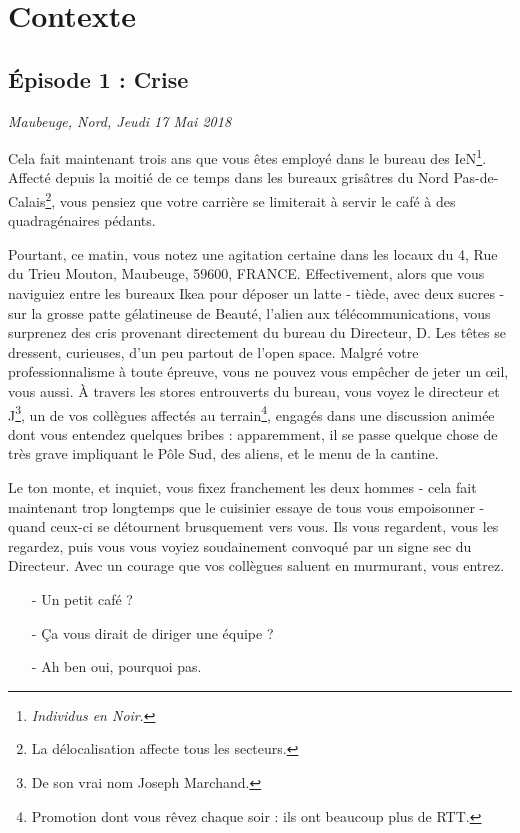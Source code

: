 \newpage

\section{Contexte}
\subsection{Épisode 1 : Crise}
\hfill \textit{Maubeuge, Nord, Jeudi 17 Mai 2018}

Cela fait maintenant trois ans que vous êtes employé dans le bureau des
IeN\footnote{\emph{Individus en Noir}\texttrademark.}.  Affecté depuis la moitié
de ce temps dans les bureaux grisâtres du Nord Pas-de-Calais\footnote{La
délocalisation affecte tous les secteurs.}, vous pensiez que votre carrière se
limiterait à servir le café à des quadragénaires pédants. 

Pourtant, ce matin, vous notez une agitation certaine dans les locaux du 4, Rue
du Trieu Mouton, Maubeuge, 59600, FRANCE.  Effectivement, alors que vous
naviguiez entre les bureaux Ikea pour déposer un latte - tiède, avec deux sucres
- sur la grosse patte gélatineuse de Beauté, l'alien aux télécommunications,
vous surprenez des cris provenant directement du bureau du Directeur, D. Les
têtes se dressent, curieuses, d'un peu partout de l'open space. Malgré votre
professionnalisme à toute épreuve, vous ne pouvez vous empêcher de jeter un œil,
vous aussi. À travers les stores entrouverts du bureau, vous voyez le directeur
et J\footnote{De son vrai nom Joseph Marchand.}, un de vos collègues affectés au
terrain\footnote{Promotion dont vous rêvez chaque soir : ils ont beaucoup plus
de RTT.}, engagés dans une discussion animée dont vous entendez quelques bribes
: apparemment, il se passe quelque chose de très grave impliquant le Pôle Sud,
des aliens, et le menu de la cantine.

Le ton monte, et inquiet, vous fixez franchement les deux hommes - cela fait
maintenant trop longtemps que le cuisinier essaye de tous vous empoisonner -
quand ceux-ci se détournent brusquement vers vous. Ils vous regardent, vous les
regardez, puis vous vous voyiez soudainement convoqué par un signe sec du
Directeur. Avec un courage que vos collègues saluent en murmurant, vous entrez.

\begin{itemize}
\item[-] Un petit café ?
\item[-] Ça vous dirait de diriger une équipe ?
\item[-] Ah ben oui, pourquoi pas.
\end{itemize}

